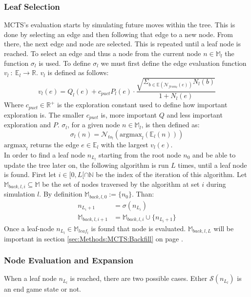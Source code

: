 \documentclass[12pt]{article}
\newcommand{\sectionref}[1]{section \ref{#1} on page \pageref{#1}}
\begin{document}
\subsubsection{Leaf Selection} \label{sec:Methods:MCTS:Leaf_selection}
MCTS's evaluation starts by simulating future moves within the tree. This is done by selecting an edge and then following that edge to a new node. From there, the next edge and node are selected. This is repeated until a leaf node is reached. To select an edge and thus a node from the current node \(n\in \mathbb{M}_l\) the function \(\sigma_l\) is used. To define \(\sigma_l\) we must first define the edge evaluation function \(v_l~:~\mathbb{E}_{l}\to\mathbb{R}\). \(v_l\) is defined as follows:
\begin{equation}
v_l(e) = Q_l(e) + c_{puct}P_l(e)\cdot\frac{\sqrt{\Sigma_{b\in\mathbb{E}(\mathcal{N}_{from_l}(e))}N_l(b)}}{1+N_l(e)}
\end{equation}
Where \(c_{puct}\in \mathbb{R}^+\) is the exploration constant used to define how important exploration is. The smaller \(c_{puct}\) is, more important \(Q\) and less important exploration and \(P\). \(\sigma_l\), for a given node \(n\in\mathbb{M}_l\), is then defined as:
\begin{equation}\label{eq:sigma}
\sigma_l(n) = \mathcal{N}_{to_l}(\text{argmax}_l(\mathbb{E}_l(n)))
\end{equation}
\(\text{argmax}_l\) returns the edge \(e \in\mathbb E_l\) with the largest \(v_l(e)\).\\
In order to find a leaf node \(n_{L_l}\) starting from the root node \(n_{0}\) and be able to update the tree later on, the following algorithm is run \(L\) times, until a leaf node is found. First let \(i \in [0,L[\cap\mathbb N\) be the index of the iteration of this algorithm. Let \(\mathbb M_{back,l,i} \subseteq \mathbb M\) be the set of nodes traversed by the algorithm at set \(i\) during simulation \(l\). By definition \(\mathbb M_{back,l,0} := \{n_0\}\). Than:
\begin{align}
n_{L_i+1} &= \sigma (n_{L_i})\\
\mathbb M_{back,l,i+1} &= \mathbb M_{back,l,i} \cup \{n_{L_i+1}\}
\end{align}
Once a leaf-node \(n_{L_l}\in\mathbb{M}_{leaf_l}\) is found that node is evaluated. \(\mathbb M_{back,l,L}\) will be important in \sectionref{sec:Methods:MCTS:Backfill}.


\subsubsection{Node Evaluation and Expansion}
\label{sec:Methods:MCTS:Node Evaluation and Expansion}
When a leaf node \(n_{L_l}\) is reached, there are two possible cases. Ether \(\mathcal S(n_{L_l})\) is an end game state or not.
\end{document}
